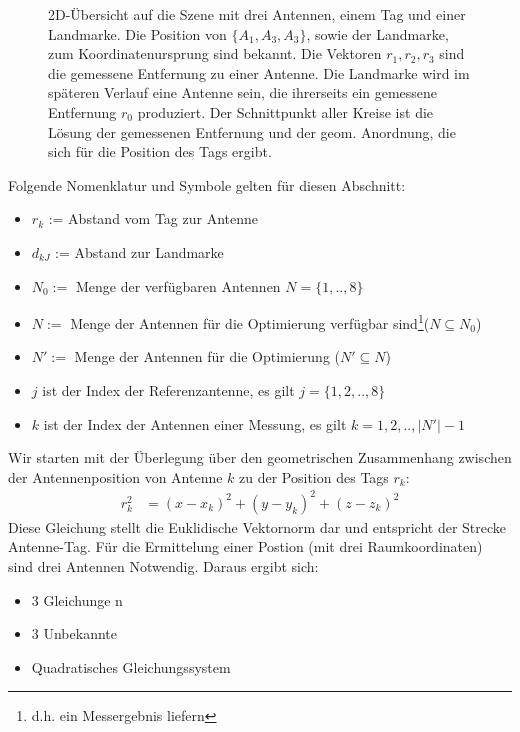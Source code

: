 \begin{figure}
	\begin{center}
		\caption[Antennen-Szene mit einem Tag]{2D-Übersicht auf die Szene mit drei Antennen, einem Tag und einer Landmarke. Die Position von $\{A_1,A_3,A_3\}$, sowie der Landmarke, zum Koordinatenursprung sind bekannt. Die Vektoren $r_1,r_2,r_3$ sind die gemessene Entfernung zu einer Antenne. Die Landmarke wird im späteren Verlauf eine Antenne sein, die ihrerseits ein gemessene Entfernung $r_0$ produziert. Der Schnittpunkt aller Kreise ist die Lösung der gemessenen Entfernung und der geom. Anordnung, die sich für die Position des Tags ergibt.} 
		\label{fig:TrilaterationScene}
		
%		
	\end{center}
\end{figure}
%
Folgende Nomenklatur und Symbole gelten für diesen Abschnitt:
\begin{itemize}[itemsep=0mm]
	\item	$r_{k}$ := Abstand vom Tag zur Antenne
	\item	$d_{kJ}$ := Abstand zur Landmarke
	\item	$N_0:=$ Menge der verfügbaren Antennen $N=\{1,..,8\}$
	\item	$N:=$ Menge der Antennen für die Optimierung verfügbar sind\footnote{d.h. ein Messergebnis liefern}($N \subseteq N_0$)
	\item	$N':=$ Menge der Antennen für die Optimierung ($N' \subseteq N$)
	\item	$j$ ist der Index der Referenzantenne, es gilt $j = \{1,2,..,8\}$
	\item	$k$ ist der Index der Antennen einer Messung, es gilt $k = 1,2,..,|N'|-1$
\end{itemize}
%
Wir starten mit der Überlegung über den geometrischen Zusammenhang zwischen der Antennenposition von Antenne $k$ zu der Position des Tags $r_k$:
\begin{align}
	\label{eq:base_vactor}
	r_{k}^2 &= (x-x_k)^2+(y-y_k)^2+(z-z_k)^2
\end{align}
%
Diese Gleichung stellt die Euklidische Vektornorm dar und entspricht der Strecke Antenne-Tag. Für die Ermittelung einer Postion (mit drei Raumkoordinaten) sind drei Antennen Notwendig. Daraus ergibt sich:
%
\begin{itemize}
\item 3 Gleichunge n
\item 3 Unbekannte
\item Quadratisches Gleichungssystem
\end{itemize}
